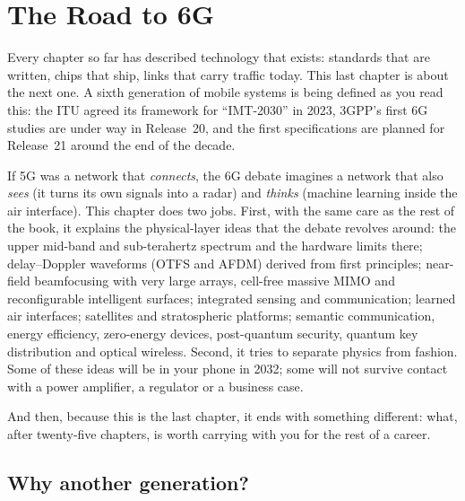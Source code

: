 \chapter{The Road to 6G}
\label{ch:sixg}

\begin{chapterintro}
Every chapter so far has described technology that exists: standards that are written, chips that
ship, links that carry traffic today. This last chapter is about the next one. A sixth generation of
mobile systems is being defined as you read this: the ITU agreed its framework for ``IMT-2030'' in
2023, 3GPP's first 6G studies are under way in Release~20, and the first specifications are planned
for Release~21 around the end of the decade.

If 5G was a network that \emph{connects}, the 6G debate imagines a network that also \emph{sees}
(it turns its own signals into a radar) and \emph{thinks} (machine learning inside the air
interface). This chapter does two jobs. First, with the same care as the rest of the book, it
explains the physical-layer ideas that the debate revolves around: the upper mid-band and
sub-terahertz spectrum and the hardware limits there; delay--Doppler waveforms (OTFS and AFDM)
derived from first principles; near-field beamfocusing with very large arrays, cell-free massive
MIMO and reconfigurable intelligent surfaces; integrated sensing and communication; learned air
interfaces; satellites and stratospheric platforms; semantic communication, energy efficiency,
zero-energy devices, post-quantum security, quantum key distribution and optical wireless. Second,
it tries to separate physics from fashion. Some of these ideas will be in your phone in 2032; some
will not survive contact with a power amplifier, a regulator or a business case.

And then, because this is the last chapter, it ends with something different: what, after
twenty-five chapters, is worth carrying with you for the rest of a career.
\end{chapterintro}


\section{Why another generation?}
\label{sec:ch25:why}

